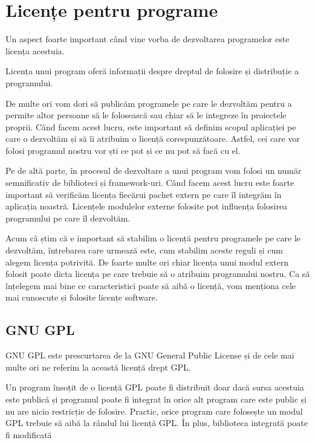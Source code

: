 \section{Licențe pentru programe}
\label{sec:appdev-licensing}

Un aspect foarte important când vine vorba de dezvoltarea programelor este
licența acestuia.

Licența unui program oferă informații despre dreptul de folosire și distribuție
a programului.

De multe ori vom dori să publicăm programele pe care le dezvoltăm pentru a
permite altor persoane să le folosească sau chiar să le integreze în proiectele
proprii. Când facem acest lucru, este important să definim scopul aplicației pe
care o dezvoltăm și să îi atribuim o licență corespunzătoare. Astfel, cei care
vor folosi programul nostru vor ști ce pot și ce nu pot să facă cu el.

Pe de altă parte, în procesul de dezvoltare a unui program vom folosi un număr
semnificativ de biblioteci și framework-uri. Când facem acest lucru este foarte
important să verificăm licența fiecărui pachet extern pe care îl integrăm în
aplicația noastră. Licențele modulelor externe folosite pot influența folosirea
programului pe care îl dezvoltăm.

Acum că știm că e important să stabilim o licență pentru programele pe care le
dezvoltăm, întrebarea care urmează este, cum stabilim aceste reguli și cum
alegem licența potrivită. De foarte multe ori chiar licența unui modul extern
folosit poate dicta licența pe care trebuie să o atribuim programului nostru. Ca
să înțelegem mai bine ce caracteristici poate să aibă o licență, vom menționa
cele mai cunoscute și folosite licențe software.

\subsection{GNU GPL}
\label{sec:appdev-licensing-gpl}

GNU  GPL  este prescurtarea de la GNU General Public License și de cele mai multe
ori ne referim la această licență drept GPL.

Un program însoțit de o licență GPL poate fi distribuit doar dacă sursa acestuia
este publică și programul poate fi integrat în orice alt program care este
public și nu are nicio restricție de folosire. Practic, orice program care
folosește un modul GPL trebuie să aibă la rândul lui licență GPL. În plus,
biblioteca integrată poate fi modificată

